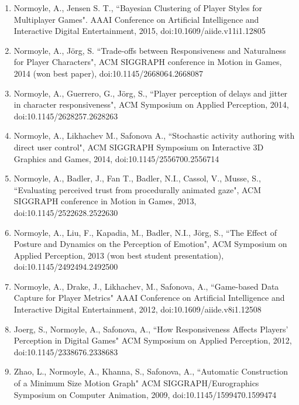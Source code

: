 \begin{enumerate}[leftmargin=*]
\item Normoyle, A., Jensen S. T., ``Bayesian Clustering of Player Styles for Multiplayer Games". AAAI Conference on Artificial Intelligence and Interactive Digital Entertainment, 2015, doi:10.1609/aiide.v11i1.12805 

\item Normoyle, A., J\"{o}rg, S. ``Trade-offs between Responsiveness and Naturalness for Player Characters", 
ACM SIGGRAPH conference in Motion in Games, 2014 (won best paper), doi:10.1145/2668064.2668087

\item Normoyle, A., Guerrero, G., J\"{o}rg, S., ``Player perception of delays and jitter in character responsiveness", 
ACM Symposium on Applied Perception, 2014, doi:10.1145/2628257.2628263

\item Normoyle, A., Likhachev M., Safonova A., ``Stochastic activity authoring with direct user control", 
ACM SIGGRAPH Symposium on Interactive 3D Graphics and Games, 2014, doi:10.1145/2556700.2556714

\item Normoyle, A., Badler, J., Fan T., Badler, N.I., Cassol, V., Musse, S., ``Evaluating perceived trust from procedurally animated gaze", ACM SIGGRAPH conference in Motion in Games, 2013, doi:10.1145/2522628.2522630

\item Normoyle, A., Liu, F., Kapadia, M., Badler, N.I., J\"{o}rg, S., ``The Effect of Posture and Dynamics on the Perception of Emotion", ACM Symposium on Applied Perception, 2013 (won best student presentation), doi:10.1145/2492494.2492500

\item Normoyle, A., Drake, J., Likhachev, M., Safonova, A., ``Game-based Data Capture for Player Metrics" 
AAAI Conference on Artificial Intelligence and Interactive Digital Entertainment, 2012, doi:10.1609/aiide.v8i1.12508 

\item Joerg, S., Normoyle, A., Safonova, A., ``How Responsiveness Affects Players' Perception in Digital Games" 
ACM Symposium on Applied Perception, 2012, doi:10.1145/2338676.2338683

\item Zhao, L., Normoyle, A., Khanna, S., Safonova, A., ``Automatic Construction of a Minimum Size Motion Graph" ACM SIGGRAPH/Eurographics Symposium on Computer Animation, 2009, doi:10.1145/1599470.1599474


\end{enumerate}
